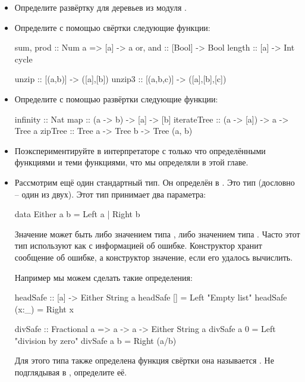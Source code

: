 \begin{itemize}

\item Определите развёртку для деревьев из модуля . 

\item Определите с помощью свёртки следующие функции:

\begin{code}
sum, prod  :: Num a => [a] -> a
or,  and   :: [Bool] -> Bool
length     :: [a] -> Int
cycle       

unzip      :: [(a,b)] -> ([a],[b])
unzip3     :: [(a,b,c)] -> ([a],[b],[c])
\end{code}


\item Определите с помощью развёртки следующие функции:

\begin{code}
infinity    :: Nat
map         :: (a -> b) -> [a] -> [b]
iterateTree :: (a -> [a]) -> a -> Tree a
zipTree     :: Tree a -> Tree b -> Tree (a, b)
\end{code}

\item Поэкспериментируйте в интерпретаторе с только 
    что определёнными функциями и теми функциями, что мы 
    определяли в этой главе.

\item Рассмотрим ещё один стандартный тип. Он определён в .
Это тип  (дословно -- один из двух). Этот тип
принимает два параметра:

\begin{code}
data Either a b = Left a | Right b
\end{code}

Значение может быть либо значением типа , либо
значением типа . Часто этот тип используют как 
 с информацией об ошибке. Конструктор 
хранит сообщение об ошибке, а конструктор  
значение, если его удалось вычислить.

Например мы можем сделать такие определения:

\begin{code}
headSafe :: [a] -> Either String a
headSafe []     = Left "Empty list" 
headSafe (x:_)  = Right x

divSafe :: Fractional a => a -> a -> Either String a
divSafe a 0 = Left "division by zero"
divSafe a b = Right (a/b)
\end{code}

Для этого типа также определена функция свёртки она
называется . Не подглядывая в ,
определите её. 


\end{itemize}
